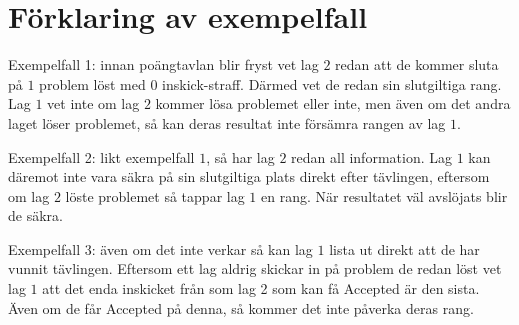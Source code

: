 \section*{Förklaring av exempelfall}
Exempelfall 1: innan poängtavlan blir fryst vet lag $2$ redan att de kommer sluta på $1$ problem löst med $0$ inskick-straff.
Därmed vet de redan sin slutgiltiga rang.
Lag $1$ vet inte om lag $2$ kommer lösa problemet eller inte, men även om det andra laget löser problemet,
så kan deras resultat inte försämra rangen av lag $1$.

Exempelfall 2: likt exempelfall $1$, så har lag $2$ redan all information.
Lag $1$ kan däremot inte vara säkra på sin slutgiltiga plats direkt efter tävlingen, eftersom om lag $2$ löste problemet så tappar lag $1$ en rang.
När resultatet väl avslöjats blir de säkra.

Exempelfall 3: även om det inte verkar så kan lag $1$ lista ut direkt att de har vunnit tävlingen.
Eftersom ett lag aldrig skickar in på problem de redan löst vet lag $1$ att det enda inskicket från som lag 2 som kan få Accepted är den sista.
Även om de får Accepted på denna, så kommer det inte påverka deras rang.
